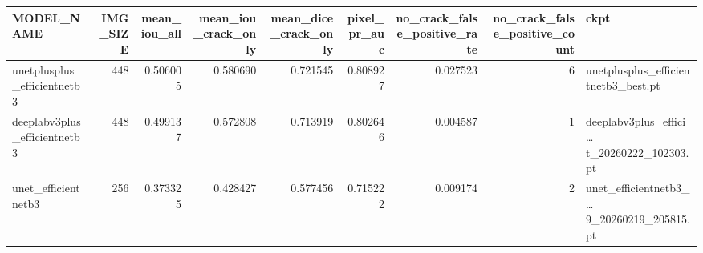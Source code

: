 \begin{tabular}{lrrrrrrrl}
\toprule
MODEL_NAME & IMG_SIZE & mean_iou_all & mean_iou_crack_only & mean_dice_crack_only & pixel_pr_auc & no_crack_false_positive_rate & no_crack_false_positive_count & ckpt \\
\midrule
unetplusplus_efficientnetb3 & 448 & 0.506005 & 0.580690 & 0.721545 & 0.808927 & 0.027523 & 6 & unetplusplus_efficientnetb3_best.pt \\
deeplabv3plus_efficientnetb3 & 448 & 0.499137 & 0.572808 & 0.713919 & 0.802646 & 0.004587 & 1 & deeplabv3plus_effici…t_20260222_102303.pt \\
unet_efficientnetb3 & 256 & 0.373325 & 0.428427 & 0.577456 & 0.715222 & 0.009174 & 2 & unet_efficientnetb3_…9_20260219_205815.pt \\
\bottomrule
\end{tabular}
